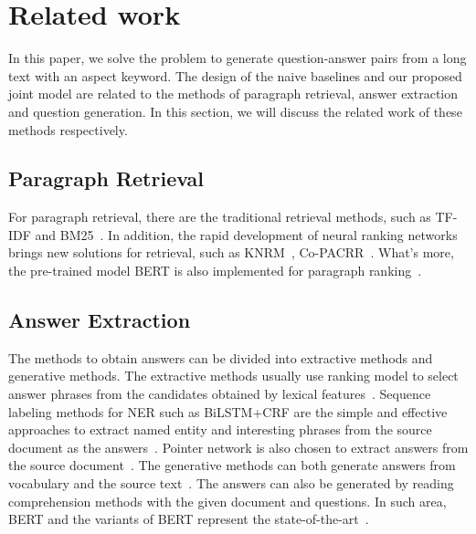 \section{Related work}
\label{sec:related}


In this paper, we solve the problem to generate question-answer pairs from a long text with an aspect keyword.
The design of the naive baselines and our proposed joint model are related to the methods of paragraph retrieval, answer extraction and question generation.
In this section, we will discuss the related work of these methods respectively.

\subsection{Paragraph Retrieval}
For paragraph retrieval, there are the traditional retrieval methods, such as TF-IDF and BM25~\cite{robertson2009probabilistic}. 
In addition, the rapid development of neural ranking networks brings new solutions for retrieval, such as KNRM~\cite{xiong2017end}, Co-PACRR~\cite{hui2018co}.
What's more, the pre-trained model BERT is also implemented for paragraph ranking~\cite{qiao2019understanding}.

\subsection{Answer Extraction}
The methods to obtain answers can be divided into extractive methods and generative methods. 
The extractive methods usually use ranking model to select answer phrases from the candidates obtained by lexical features~\cite{witten2005kea,liu2011automatic,wang2016ptr,subramanian2017neural}.
Sequence labeling methods for NER such as BiLSTM+CRF are the simple and effective approaches to extract named entity and interesting phrases from the source document as the answers~\cite{lample2016neural}.
Pointer network is also chosen to extract answers from the source document~\cite{subramanian2017neural}.
The generative methods can both generate answers from vocabulary and the source text~\cite{meng2017deep,chen2018keyphrase,ye2018semi}.
The answers can also be generated by reading comprehension methods with the given document and questions.
In such area, BERT and the variants of BERT represent the state-of-the-art~\cite{devlin2018bert,lan2019albert}.

